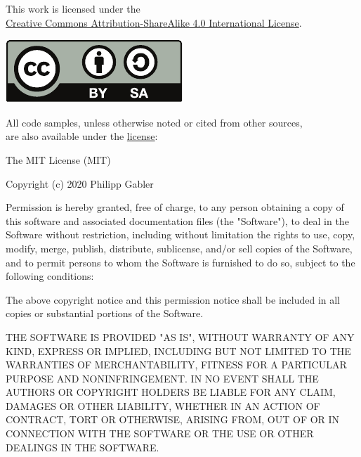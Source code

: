 \begin{adjustwidth}{\absleftindent}{\absrightindent}
  \label{license}

  \begin{symbolicfootnotes}
    \abstracttextfont
    \begin{center}
      This work is licensed under the \\
      \href{http://creativecommons.org/licenses/by-sa/4.0/}{Creative Commons Attribution-ShareAlike
        4.0 International License}.
    \end{center}
    \begin{center}
      \includegraphics[scale=1]{figures/by-sa}
    \end{center}
    \begin{center}
      All code samples, unless otherwise noted or cited from other sources, \\ are also available
      under the \href{http://opensource.org/licenses/MIT}{ license}:
    \end{center}
    \vspace*{-1ex}
    \begin{ttfamily}
      \nonzeroparskip
      \setlength{\parindent}{0pt}
      The MIT License (MIT)

      Copyright (c) 2020 Philipp Gabler

      Permission is hereby granted, free of charge, to any person obtaining a copy of this software
      and associated documentation files (the "Software"), to deal in the Software without
      restriction, including without limitation the rights to use, copy, modify, merge, publish,
      distribute, sublicense, and/or sell copies of the Software, and to permit persons to whom the
      Software is furnished to do so, subject to the following conditions:

      The above copyright notice and this permission notice shall be included in all copies or
      substantial portions of the Software.

      THE SOFTWARE IS PROVIDED "AS IS", WITHOUT WARRANTY OF ANY KIND, EXPRESS OR IMPLIED, INCLUDING
      BUT NOT LIMITED TO THE WARRANTIES OF MERCHANTABILITY, FITNESS FOR A PARTICULAR PURPOSE AND
      NON\-IN\-FRINGE\-MENT. IN NO EVENT SHALL THE AUTHORS OR COPYRIGHT HOLDERS BE LIABLE FOR ANY
      CLAIM, DAMAGES OR OTHER LIABILITY, WHETHER IN AN ACTION OF CONTRACT, TORT OR OTHERWISE, ARISING
      FROM, OUT OF OR IN CONNECTION WITH THE SOFTWARE OR THE USE OR OTHER DEALINGS IN THE SOFTWARE.
      \traditionalparskip
    \end{ttfamily}
    

\end{symbolicfootnotes}
\end{adjustwidth}
